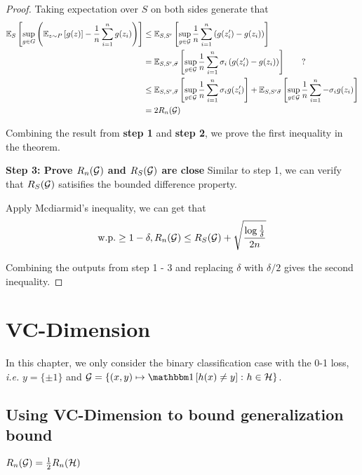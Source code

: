 \begin{proof}
    Taking expectation over \(S\) on both sides generate that 
    \begin{align*}
        \mathbb{E}_S \left[ \sup_{g\in G} \left(\mathbb{E}_{z\sim P}\left[ g(z) \right] - \frac{1}{n}\sum_{i=1}^n g(z_i)\right) \right]
        &\leq \mathbb{E}_{S,S'} \left[ \sup_{g\in \mathcal{G}} \frac{1}{n} \sum_{i=1}^n \left(g(z_i') - g(z_i)\right) \right] \\ 
        &= \mathbb{E}_{S, S', \vec{\sigma}} \left[ \sup_{g \in \mathcal{G}} \frac{1}{n} \sum_{i=1}^n \sigma_i 
        \left(g(z_i') - g(z_i)\right) \right]  \tag*{?}\\
        &\leq \mathbb{E}_{S, S', \vec{\sigma}} \left[ \sup_{g \in \mathcal{G}} \frac{1}{n} \sum_{i=1}^n \sigma_i g(z_i') \right]
        + \mathbb{E}_{S, S' \vec{\sigma}} \left[ \sup_{g\in\mathcal{G}}\frac{1}{n}\sum_{i=1}^n - \sigma_i g(z_i) \right] \\ 
        &= 2 R_n (\mathcal{G})
    \end{align*}

    Combining the result from \textbf{step 1} and \textbf{step 2}, we prove the first inequality in the theorem. 

    \textbf{Step 3: Prove \(R_n(\mathcal{G})\) and \(R_S(\mathcal{G})\) are close}
    Similar to step 1, we can verify that \(R_S(\mathcal{G})\) satisifies the bounded difference property. 
    
    Apply Mcdiarmid's inequality, we can get that 
    \[
      \text{w.p.} \geq 1 - \delta, R_n(\mathcal{G}) \leq R_S (\mathcal{G}) + \sqrt{\frac{\log \frac{1}{\delta}}{2n}}    
    \]

    Combining the outputs from step 1 - 3 and replacing \(\delta\) with \(\delta / 2\) gives the second 
    inequality. 
\end{proof}



\chapter{VC-Dimension}

In this chapter, we only consider the binary classification case with the 0-1 loss, 
\emph{i.e.} \(y = \{ \pm 1\}\) and \(\G = \{(x, y) \mapsto \indi \midBrac{h(x)\neq y} \colon h \in \Hcal \}\).

\section{Using VC-Dimension to bound generalization bound}

\begin{lemma}\label{lem:rnG and rnH}
    \(R_n (\mathcal{G}) = \frac{1}{2} R_n (\mathcal{H})\)
\end{lemma}

